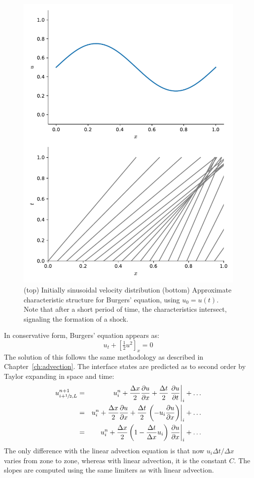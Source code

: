 \begin{figure}[t]
\centering
\includegraphics[width=0.6\linewidth]{burgers-characteristics}
\caption[Characteristics for shock initial conditions]
{\label{fig:burgers_char} (top) Initially sinusoidal
velocity distribution (bottom) Approximate characteristic
structure for Burgers' equation, using $u_0 = u(t)$.  Note that
after a short period of time, the characteristics intersect, signaling
the formation of a shock.}
\end{figure}



In conservative form, Burgers' equation appears as:
\begin{equation}
u_t + \left [\tfrac{1}{2} u^2 \right ]_x = 0
\end{equation}
The solution of this follows the same methodology as described in
Chapter~\ref{ch:advection}.  The interface states are predicted as to
second order by Taylor expanding in space and time:
\begin{eqnarray}
u^{n+1}_{i+{\sfrac{1}{2}},L}
 &=& u^n_i + \frac{\Delta x}{2} \frac{\partial u}{\partial x}
    + \frac{\Delta t}{2} \left . \frac{\partial u}{\partial t} \right |_i
    + \ldots \\
 &=& u^n_i + \frac{\Delta x}{2} \frac{\partial u}{\partial x}
    + \frac{\Delta t}{2} \left . \left (-u_i \frac{\partial u}{\partial x}
         \right ) \right |_i
    + \ldots \\
 &=& u^n_i + \frac{\Delta x}{2}
   \left ( 1 - \frac{\Delta t}{\Delta x} u_i \right )
   \left . \frac{\partial u}{\partial x} \right |_i + \ldots
\end{eqnarray}
The only difference with the linear advection equation is that now
$u_i \Delta t/\Delta x$ varies from zone to zone, whereas with linear
advection, it is the constant $C$.  The slopes are computed using
the same limiters as with linear advection.

